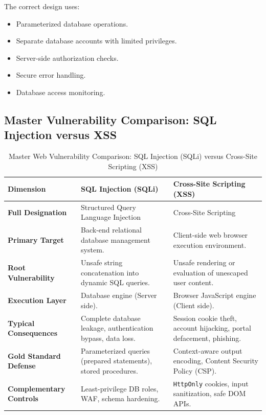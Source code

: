 The correct design uses:

\begin{itemize}
\item Parameterized database operations.
\item Separate database accounts with limited privileges.
\item Server-side authorization checks.
\item Secure error handling.
\item Database access monitoring.
\end{itemize}

\subsection{Master Vulnerability Comparison: SQL Injection versus XSS}

\begin{table}[htbp]
\centering
\caption{Master Web Vulnerability Comparison: SQL Injection (SQLi) versus Cross-Site Scripting (XSS)}
\label{tab:sqli_vs_xss}
\begin{tabularx}{\textwidth}{p{3.2cm} p{5.5cm} X}
\toprule
\textbf{Dimension} & \textbf{SQL Injection (SQLi)} & \textbf{Cross-Site Scripting (XSS)} \\
\midrule
\textbf{Full Designation} & Structured Query Language Injection & Cross-Site Scripting \\
\textbf{Primary Target} & Back-end relational database management system. & Client-side web browser execution environment. \\
\textbf{Root Vulnerability} & Unsafe string concatenation into dynamic SQL queries. & Unsafe rendering or evaluation of unescaped user content. \\
\textbf{Execution Layer} & Database engine (Server side). & Browser JavaScript engine (Client side). \\
\textbf{Typical Consequences} & Complete database leakage, authentication bypass, data loss. & Session cookie theft, account hijacking, portal defacement, phishing. \\
\textbf{Gold Standard Defense} & Parameterized queries (prepared statements), stored procedures. & Context-aware output encoding, Content Security Policy (CSP). \\
\textbf{Complementary Controls} & Least-privilege DB roles, WAF, schema hardening. & \texttt{HttpOnly} cookies, input sanitization, safe DOM APIs. \\
\bottomrule
\end{tabularx}
\end{table}


